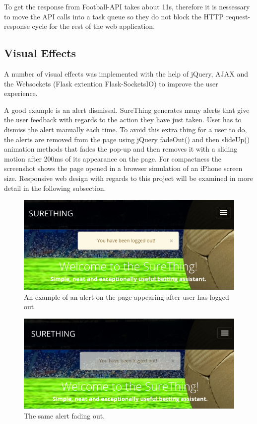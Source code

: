 To get the response from Football-API takes about 11s, therefore it is nessessary to move the API calls into a task queue so they do not block the HTTP request-response cycle for the rest of the web application.

\subsection{Visual Effects}
A number of visual effects was implemented with the help of jQuery, AJAX and the Websockets (Flask extention Flask-SocketsIO) to improve the user experience. 

A good example is an alert dismissal. SureThing generates many alerts that give the user feedback with regards to the action they have just taken. User has to dismiss the alert manually each time. To avoid this extra thing for a user to do, the alerts are removed from the page using jQuery fadeOut() and then slideUp() animation methods that fades the pop-up and then removes it with a sliding motion after 200ms of its appearance on the page. For compactness the screenshot shows the page opened in a browser simulation of an iPhone screen size. Responsive web design with regards to this project will be examined in more detail in the following subsection.

\begin{figure}[H]
	\begin{center}
		\includegraphics[width=.60\linewidth,natwidth=610,natheight=642]{impl/images/alert}
		\caption{An example of an alert on the page appearing after user has logged out} \label{fig:alert}
	\end{center}
\end{figure}

\begin{figure}[H]
	\begin{center}
		\includegraphics[width=.60\linewidth,natwidth=610,natheight=642]{impl/images/alertFadeOut}
		\caption{The same alert fading out.} \label{fig:alertFadeOut}
	\end{center}
\end{figure}

